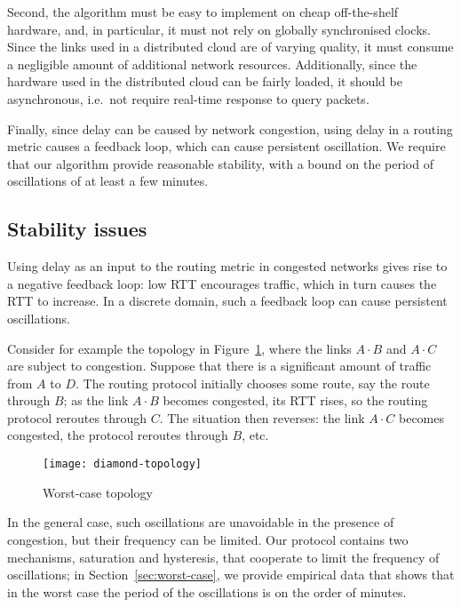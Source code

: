 \documentclass[conference,letterpaper]{IEEEtran}
\begin{document}
Second, the algorithm must be easy to implement on cheap off-the-shelf
hardware, and, in particular, it must not rely on globally
synchronised clocks.  Since the links used in a distributed cloud are
of varying quality, it must consume a negligible amount of additional
network resources.  Additionally, since the hardware used in the
distributed cloud can be fairly loaded, it should be asynchronous,
i.e.\ not require real-time response to query packets.

Finally, since delay can be caused by network congestion, using delay
in a routing metric causes a feedback loop, which can cause persistent
oscillation.  We require that our algorithm provide reasonable
stability, with a bound on the period of oscillations of at least
a few minutes.

\subsection{Stability issues} \label{sec:stability}

Using delay as an input to the routing metric in congested networks
gives rise to a negative feedback loop: low RTT encourages traffic,
which in turn causes the RTT to increase.  In a discrete domain, such
a feedback loop can cause persistent oscillations.

Consider for example the topology in Figure~\ref{fig:diamond-topology},
where the links $A\cdot B$ and $A\cdot C$ are subject to congestion.
Suppose that there is a significant amount of traffic from $A$ to $D$.
The routing protocol initially chooses some route, say the route
through $B$; as the link $A\cdot B$ becomes congested, its RTT rises,
so the routing protocol reroutes through $C$.  The situation then
reverses: the link $A\cdot C$ becomes congested, the protocol reroutes
through $B$, etc.

\begin{figure}[htb]
\centering
\texttt{[image: diamond-topology]}
\caption{Worst-case topology}
\label{fig:diamond-topology}
\end{figure}

In the general case, such oscillations are unavoidable in the presence
of congestion, but their frequency can be limited.  Our protocol
contains two mechanisms, saturation and hysteresis, that cooperate to
limit the frequency of oscillations; in Section~\ref{sec:worst-case},
we provide empirical data that shows that in the worst case the period
of the oscillations is on the order of minutes.
\end{document}
